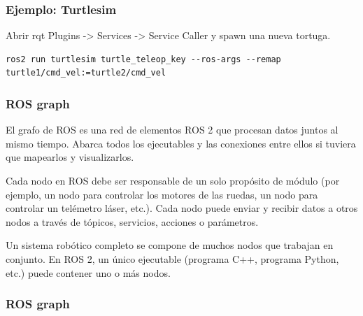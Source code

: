 \begin{frame}[fragile]
	\frametitle{Ejemplo: Turtlesim}
	\footnotesize
	
    Abrir rqt
	Plugins -> Services -> Service Caller y spawn una nueva tortuga.
\begin{lstlisting}[style=bash]    
ros2 run turtlesim turtle_teleop_key --ros-args --remap turtle1/cmd_vel:=turtle2/cmd_vel
\end{lstlisting}

\end{frame}

\begin{frame}
    \frametitle{ROS graph}
    El grafo de ROS es una red de elementos ROS 2 que procesan datos juntos al mismo tiempo. Abarca todos los ejecutables y las conexiones entre ellos si tuviera que mapearlos y visualizarlos.
    
    Cada nodo en ROS debe ser responsable de un solo propósito de módulo (por ejemplo, un nodo para controlar los motores de las ruedas, un nodo para controlar un telémetro láser, etc.). Cada nodo puede enviar y recibir datos a otros nodos a través de tópicos, servicios, acciones o parámetros.
    
    Un sistema robótico completo se compone de muchos nodos que trabajan en conjunto. En ROS 2, un único ejecutable (programa C++, programa Python, etc.) puede contener uno o más nodos.
\end{frame}

\begin{frame}[fragile]
	\frametitle{ROS graph}
	
	\begin{center}
	\end{center}
	
\end{frame}


